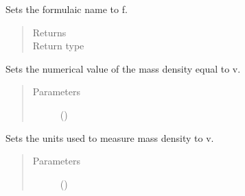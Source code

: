 \documentclass[letterpaper,10pt,openany,oneside,english]{sphinxmanual}
\begin{document}
\begin{fulllineitems}
\begin{fulllineitems}
\begin{quote}
\begin{description}
\end{description}\end{quote}

\end{fulllineitems}


\begin{fulllineitems}
\label{\detokenize{support_rst/specie:specie.Specie.SetFormulaName}}
Sets the formulaic name to f.
\begin{quote}\begin{description}
\item[{Returns}] \leavevmode
{}

\item[{Return type}] \leavevmode
{}

\end{description}\end{quote}

\end{fulllineitems}


\begin{fulllineitems}
\label{\detokenize{support_rst/specie:specie.Specie.SetMassCC}}
Sets the numerical value of the mass density equal to v.
\begin{quote}\begin{description}
\item[{Parameters}] \leavevmode
{} () \textendash{} 

\end{description}\end{quote}

\end{fulllineitems}


\begin{fulllineitems}
\label{\detokenize{support_rst/specie:specie.Specie.SetMassCCUnit}}
Sets the units used to measure mass density to v.
\begin{quote}\begin{description}
\item[{Parameters}] \leavevmode
{} () \textendash{} 


\end{description}
\end{quote}
\end{fulllineitems}
\end{fulllineitems}
\end{document}
